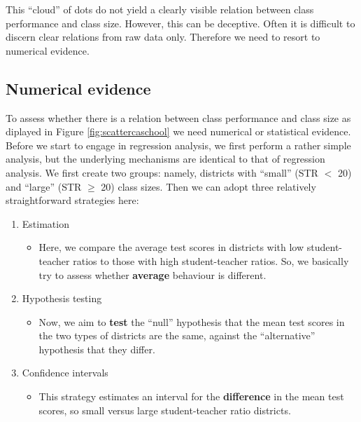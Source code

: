\documentclass[
]{book}
\providecommand{\tightlist}{%
  \setlength{\itemsep}{0pt}\setlength{\parskip}{0pt}}
\begin{document}
This ``cloud'' of dots do not yield a clearly visible relation between class performance and class size. However, this can be deceptive. Often it is difficult to discern clear relations from raw data only. Therefore we need to resort to numerical evidence.

\hypertarget{sec:numevidence}{%
\subsection{Numerical evidence}\label{sec:numevidence}}

To assess whether there is a relation between class performance and class size as diplayed in Figure \ref{fig:scattercaschool} we need numerical or statistical evidence. Before we start to engage in regression analysis, we first perform a rather simple analysis, but the underlying mechanisms are identical to that of regression analysis. We first create two groups: namely, districts with ``small'' (STR \(<\) 20) and ``large'' (STR \(\geq\) 20) class sizes. Then we can adopt three relatively straightforward strategies here:

\begin{enumerate}
\def\labelenumi{\arabic{enumi}.}
\tightlist
\item
  Estimation

  \begin{itemize}
  \tightlist
  \item
    Here, we compare the average test scores in districts with low student-teacher ratios to those with high student-teacher ratios. So, we basically try to assess whether \textbf{average} behaviour is different.
  \end{itemize}
\item
  Hypothesis testing

  \begin{itemize}
  \tightlist
  \item
    Now, we aim to \textbf{test} the ``null'' hypothesis that the mean test scores in the two types of districts are the same, against the ``alternative'' hypothesis that they differ.
  \end{itemize}
\item
  Confidence intervals

  \begin{itemize}
  \tightlist
  \item
    This strategy estimates an interval for the \textbf{difference} in the mean test scores, so small versus large student-teacher ratio districts.
  \end{itemize}
\end{enumerate}
\end{document}
